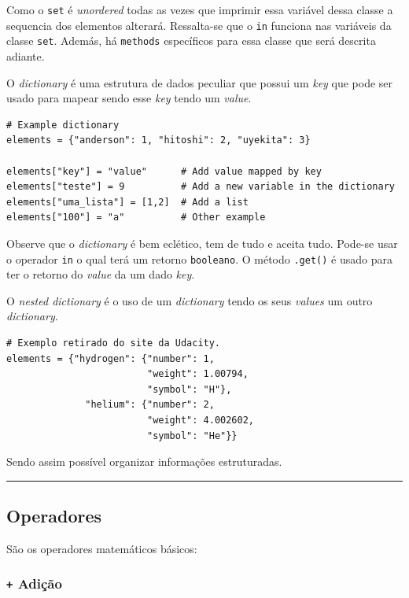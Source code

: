\documentclass[]{book}
\begin{document}
Como o \texttt{set} é \emph{unordered} todas as vezes que imprimir essa
variável dessa classe a sequencia dos elementos alterará. Ressalta-se
que o \texttt{in} funciona nas variáveis da classe \texttt{set}. Además,
há \texttt{methods} específicos para essa classe que será descrita
adiante.

O \emph{dictionary} é uma estrutura de dados peculiar que possui um
\emph{key} que pode ser usado para mapear sendo esse \emph{key} tendo um
\emph{value}.

\begin{verbatim}
# Example dictionary
elements = {"anderson": 1, "hitoshi": 2, "uyekita": 3}

elements["key"] = "value"      # Add value mapped by key
elements["teste"] = 9          # Add a new variable in the dictionary
elements["uma_lista"] = [1,2]  # Add a list
elements["100"] = "a"          # Other example
\end{verbatim}

Observe que o \emph{dictionary} é bem eclético, tem de tudo e aceita
tudo. Pode-se usar o operador \texttt{in} o qual terá um retorno
\texttt{booleano}. O método \texttt{.get()} é usado para ter o retorno
do \emph{value} da um dado \emph{key}.

O \emph{nested dictionary} é o uso de um \emph{dictionary} tendo os seus
\emph{values} um outro \emph{dictionary}.

\begin{verbatim}
# Exemplo retirado do site da Udacity.
elements = {"hydrogen": {"number": 1,
                         "weight": 1.00794,
                         "symbol": "H"},
              "helium": {"number": 2,
                         "weight": 4.002602,
                         "symbol": "He"}}
\end{verbatim}

Sendo assim possível organizar informações estruturadas.

\begin{center}\rule{0.5\linewidth}{\linethickness}\end{center}

\subsection{Operadores}\label{operadores}

São os operadores matemáticos básicos:

\subsubsection{\texorpdfstring{\texttt{+}
Adição}{+ Adição}}\label{adicao}
\end{document}
